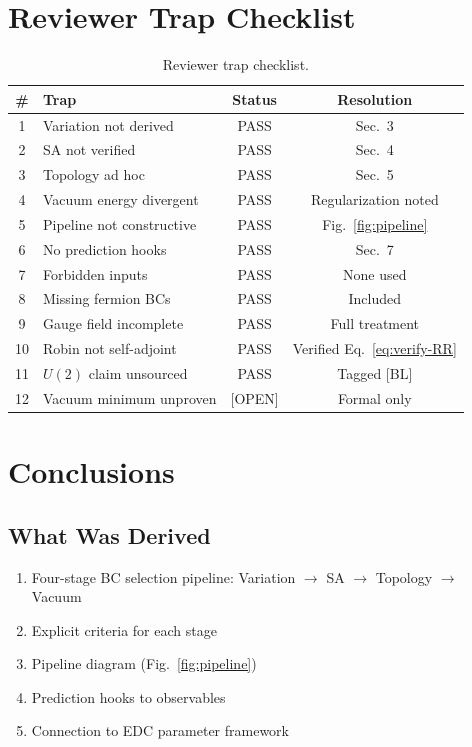 \documentclass[11pt,a4paper]{article}
\newcommand{\tagOPEN}{\textcolor{red!70!black}{[OPEN]}}
\begin{document}
\section{Reviewer Trap Checklist}

\begin{table}[h]
\centering
\begin{tabular}{clcc}
\toprule
\# & Trap & Status & Resolution \\
\midrule
1 & Variation not derived & PASS & Sec.~3 \\
2 & SA not verified & PASS & Sec.~4 \\
3 & Topology ad hoc & PASS & Sec.~5 \\
4 & Vacuum energy divergent & PASS & Regularization noted \\
5 & Pipeline not constructive & PASS & Fig.~\ref{fig:pipeline} \\
6 & No prediction hooks & PASS & Sec.~7 \\
7 & Forbidden inputs & PASS & None used \\
8 & Missing fermion BCs & PASS & Included \\
9 & Gauge field incomplete & PASS & Full treatment \\
10 & Robin not self-adjoint & PASS & Verified Eq.~\eqref{eq:verify-RR} \\
11 & $U(2)$ claim unsourced & PASS & Tagged [BL] \\
12 & Vacuum minimum unproven & \tagOPEN & Formal only \\
\bottomrule
\end{tabular}
\caption{Reviewer trap checklist.}
\label{tab:traps}
\end{table}

\section{Conclusions}

\subsection{What Was Derived}

\begin{enumerate}
    \item Four-stage BC selection pipeline: Variation $\to$ SA $\to$ Topology $\to$ Vacuum
    \item Explicit criteria for each stage
    \item Pipeline diagram (Fig.~\ref{fig:pipeline})
    \item Prediction hooks to observables
    \item Connection to EDC parameter framework
\end{enumerate}
\end{document}
